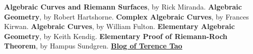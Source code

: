 \begin{thebibliography}{9}
     \textbf{Algebraic Curves and Riemann Surfaces}, by Rick Miranda.
     \textbf{Algebraic Geometry}, by Robert Hartshorne.
     \textbf{Complex Algebraic Curves}, by Frances Kirwan.
     \textbf{Algebraic Curves}, by William Fulton.
     \textbf{Elementary Algebraic Geometry}, by Keith Kendig.
     \textbf{Elementary Proof of Riemann-Roch Theorem}, by Hampus Sundgren.
     \textbf{\href{https://terrytao.wordpress.com/2018/03/28/246c-notes-1-meromorphic-functions-on-riemann-surfaces-and-the-riemann-roch-theorem/}{Blog of Terence Tao}}
\end{thebibliography}
